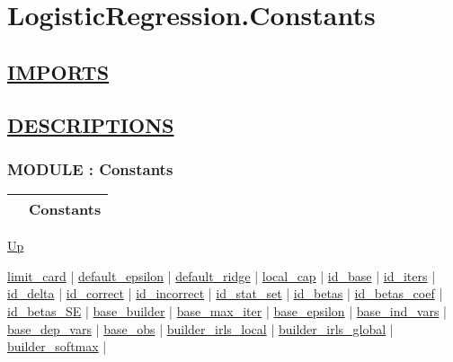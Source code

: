 \chapter*{LogisticRegression.Constants}
\hypertarget{ecldoc:toc:LogisticRegression.Constants}{}

\section*{\underline{IMPORTS}}

\section*{\underline{DESCRIPTIONS}}
\subsection*{MODULE : Constants}
\hypertarget{ecldoc:LogisticRegression.Constants}{}

{\renewcommand{\arraystretch}{1.5}
\begin{tabularx}{\textwidth}{|>{\raggedright\arraybackslash}l|X|}
\hline
\hspace{0pt} & Constants \\
\hline
\end{tabularx}
}

\hyperlink{ecldoc:toc:LogisticRegression}{Up}

\par


\hyperlink{ecldoc:logisticregression.constants.limit_card}{limit\_card}  |
\hyperlink{ecldoc:logisticregression.constants.default_epsilon}{default\_epsilon}  |
\hyperlink{ecldoc:logisticregression.constants.default_ridge}{default\_ridge}  |
\hyperlink{ecldoc:logisticregression.constants.local_cap}{local\_cap}  |
\hyperlink{ecldoc:logisticregression.constants.id_base}{id\_base}  |
\hyperlink{ecldoc:logisticregression.constants.id_iters}{id\_iters}  |
\hyperlink{ecldoc:logisticregression.constants.id_delta}{id\_delta}  |
\hyperlink{ecldoc:logisticregression.constants.id_correct}{id\_correct}  |
\hyperlink{ecldoc:logisticregression.constants.id_incorrect}{id\_incorrect}  |
\hyperlink{ecldoc:logisticregression.constants.id_stat_set}{id\_stat\_set}  |
\hyperlink{ecldoc:logisticregression.constants.id_betas}{id\_betas}  |
\hyperlink{ecldoc:logisticregression.constants.id_betas_coef}{id\_betas\_coef}  |
\hyperlink{ecldoc:logisticregression.constants.id_betas_se}{id\_betas\_SE}  |
\hyperlink{ecldoc:logisticregression.constants.base_builder}{base\_builder}  |
\hyperlink{ecldoc:logisticregression.constants.base_max_iter}{base\_max\_iter}  |
\hyperlink{ecldoc:logisticregression.constants.base_epsilon}{base\_epsilon}  |
\hyperlink{ecldoc:logisticregression.constants.base_ind_vars}{base\_ind\_vars}  |
\hyperlink{ecldoc:logisticregression.constants.base_dep_vars}{base\_dep\_vars}  |
\hyperlink{ecldoc:logisticregression.constants.base_obs}{base\_obs}  |
\hyperlink{ecldoc:logisticregression.constants.builder_irls_local}{builder\_irls\_local}  |
\hyperlink{ecldoc:logisticregression.constants.builder_irls_global}{builder\_irls\_global}  |
\hyperlink{ecldoc:logisticregression.constants.builder_softmax}{builder\_softmax}  |

